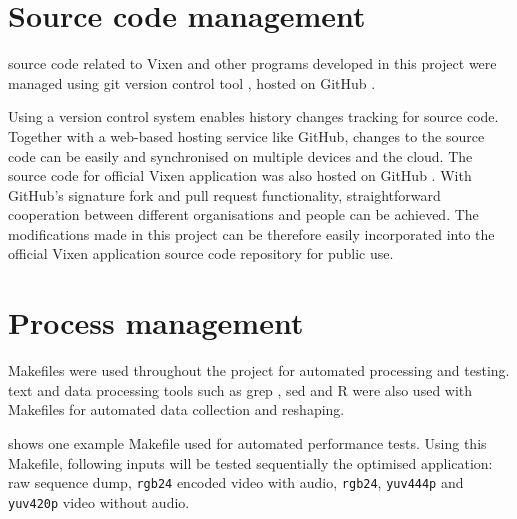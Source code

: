 \renewcommand{\baselinestretch}{\mystretch}
\label{chap:Management}

\section{Source code management}

 source code related to Vixen and other programs developed in this project were managed using git version control tool \cite{git}, hosted on GitHub \cite{github} \cite{github_vixen_yz} \cite{github_project}.

Using a version control system enables history changes tracking for source code. Together with a web-based hosting service like GitHub, changes to the source code can be easily  and synchronised on multiple devices and the cloud. The source code for official Vixen application was also hosted on GitHub \cite{github_vixen}. With GitHub's signature fork and pull request functionality, straightforward cooperation between different organisations and people can be achieved. The modifications made in this project can be therefore easily incorporated into the official Vixen application source code repository for public use.

\section{Process management}

Makefiles \cite{make} were used throughout the project for automated processing and testing.  text and data processing tools such as grep \cite{grep}, sed \cite{sed} and R \cite{r_project} were also used with Makefiles for automated data collection and reshaping.

 shows one example Makefile used for automated performance tests. Using this Makefile,  following inputs will be tested sequentially  the optimised  application: raw sequence dump, \texttt{rgb24} encoded video with audio, \texttt{rgb24}, \texttt{yuv444p} and \texttt{yuv420p}  video without audio.
